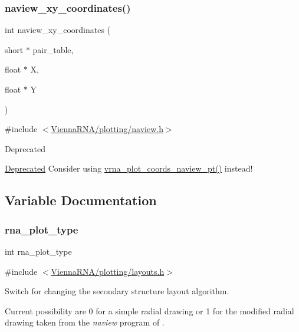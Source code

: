 \subsubsection{\texorpdfstring{naview\_xy\_coordinates()}{naview\_xy\_coordinates()}}
{\footnotesize\ttfamily int naview\+\_\+xy\+\_\+coordinates (\begin{DoxyParamCaption}\item[{short $\ast$}]{pair\+\_\+table,  }\item[{float $\ast$}]{X,  }\item[{float $\ast$}]{Y }\end{DoxyParamCaption})}



{\ttfamily \#include $<$\mbox{\hyperlink{plotting_2naview_8h}{Vienna\+R\+N\+A/plotting/naview.\+h}}$>$}

\begin{DoxyRefDesc}{Deprecated}
\item[\mbox{\hyperlink{deprecated__deprecated000173}{Deprecated}}]Consider using \mbox{\hyperlink{group__plot__layout__utils_gaa5089debe89c11e301dea04b3236efe3}{vrna\+\_\+plot\+\_\+coords\+\_\+naview\+\_\+pt()}} instead! \end{DoxyRefDesc}


\subsection{Variable Documentation}
\mbox{\label{group__plotting__utils__deprecated_ga5964c4581431b098b80027d6e14dcdd4}} 
\subsubsection{\texorpdfstring{rna\_plot\_type}{rna\_plot\_type}}
{\footnotesize\ttfamily int rna\+\_\+plot\+\_\+type}



{\ttfamily \#include $<$\mbox{\hyperlink{layouts_8h}{Vienna\+R\+N\+A/plotting/layouts.\+h}}$>$}



Switch for changing the secondary structure layout algorithm. 

Current possibility are 0 for a simple radial drawing or 1 for the modified radial drawing taken from the {\itshape naview} program of \cite{bruccoleri:1988}.

